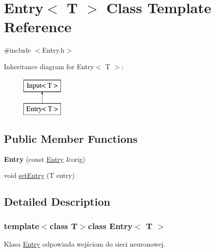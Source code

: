 \hypertarget{class_entry}{\section{\-Entry$<$ \-T $>$ \-Class \-Template \-Reference}
\label{class_entry}
}


{\ttfamily \#include $<$\-Entry.\-h$>$}

\-Inheritance diagram for \-Entry$<$ \-T $>$\-:\begin{figure}[H]
\begin{center}
\leavevmode
\includegraphics[height=2.000000cm]{class_entry}
\end{center}
\end{figure}
\subsection*{\-Public \-Member \-Functions}
\begin{DoxyCompactItemize}
\item 
\hypertarget{class_entry_aa5b0b7444339efa02150964d4f82e18d}{{\bfseries \-Entry} (const \hyperlink{class_entry}{\-Entry} \&orig)}\label{class_entry_aa5b0b7444339efa02150964d4f82e18d}

\item 
void \hyperlink{class_entry_afdde8cf7183ac5a343fbe993f361be4f}{set\-Entry} (\-T entry)
\end{DoxyCompactItemize}


\subsection{\-Detailed \-Description}
\subsubsection*{template$<$class T$>$class Entry$<$ T $>$}

\-Klasa \hyperlink{class_entry}{\-Entry} odpowiada wejściom do sieci neuronowej. 

